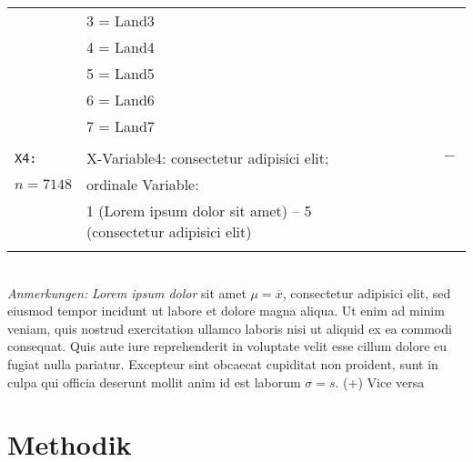 \begin{table}[!htbp]
\begin{tabularx}{\columnwidth}{XXl}
& 3 = Land3 &\\
& 4 = Land4 &\\
& 5 = Land5 &\\
& 6 = Land6 &\\
& 7 = Land7 &\\
\\
\hline
\texttt{X4:}   & X-Variable4: consectetur adipisici elit; & $\qquad \qquad  \qquad  -$ \\
$n=7148$ &ordinale Variable:&\\
&1 (Lorem ipsum dolor sit amet) -- 5 (consectetur adipisici elit)&\\
\\
\hline 
\end{tabularx} 
\\
\tiny{\emph{Anmerkungen:} \emph{Lorem ipsum dolor} sit amet $\mu=\overline{x}$, consectetur adipisici elit, sed eiusmod tempor incidunt ut labore et dolore magna aliqua. Ut enim ad minim veniam, quis nostrud exercitation ullamco laboris nisi ut aliquid ex ea commodi consequat. Quis aute iure reprehenderit in voluptate velit esse cillum dolore eu fugiat nulla pariatur. Excepteur sint obcaecat cupiditat non proident, sunt in culpa qui officia deserunt mollit anim id est laborum $\sigma=s$. (+) Vice versa}
\end{table}
\newpage

\section{Methodik}
